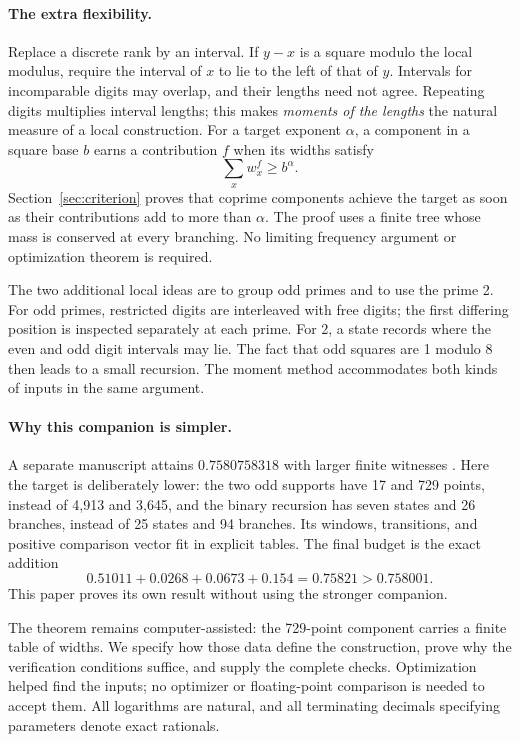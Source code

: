 \documentclass[11pt]{article}
\theoremstyle{definition}
\theoremstyle{remark}
\begin{document}
\paragraph{The extra flexibility.}
Replace a discrete rank by an interval. If $y-x$ is a square modulo the
local modulus, require the interval of $x$ to lie to the left of that of
$y$. Intervals for incomparable digits may overlap, and their lengths
need not agree. Repeating digits multiplies interval lengths; this makes
\emph{moments of the lengths} the natural measure of a local construction.
For a target exponent $\alpha$, a component in a square base $b$ earns a
contribution $f$ when its widths satisfy
\[
 \sum_x w_x^f\ge b^\alpha.
\]
Section~\ref{sec:criterion} proves that coprime components achieve the target
as soon as their contributions add to more than $\alpha$. The proof uses
a finite tree whose mass is conserved at every branching. No limiting
frequency argument or optimization theorem is required.

The two additional local ideas are to group odd primes and to use the
prime 2. For odd primes, restricted digits are interleaved with free digits;
the first differing position is inspected separately at each prime.
For 2, a state records where the even and odd digit intervals may lie.
The fact that odd squares are 1 modulo 8 then leads to a small recursion.
The moment method accommodates both kinds of inputs in the same argument.

\paragraph{Why this companion is simpler.}
A separate manuscript attains $0.7580758318$ with larger finite witnesses
\cite{NaslundCompanion2026}. Here the target is deliberately lower:
the two odd supports have 17 and 729 points, instead of 4,913 and 3,645,
and the binary recursion has seven states and 26 branches, instead of
25 states and 94 branches. Its windows, transitions, and positive comparison
vector fit in explicit tables. The final budget is the exact addition
\begin{equation}\label{eq:budgetintro}
 0.51011+0.0268+0.0673+0.154=0.75821>0.758001.
\end{equation}
This paper proves its own result without using the stronger companion.

The theorem remains computer-assisted: the 729-point component carries a
finite table of widths. We specify how those data define the construction,
prove why the verification conditions suffice, and supply the complete
checks. Optimization helped find the inputs; no optimizer or floating-point
comparison is needed to accept them. All logarithms are natural, and all
terminating decimals specifying parameters denote exact rationals.
\end{document}
